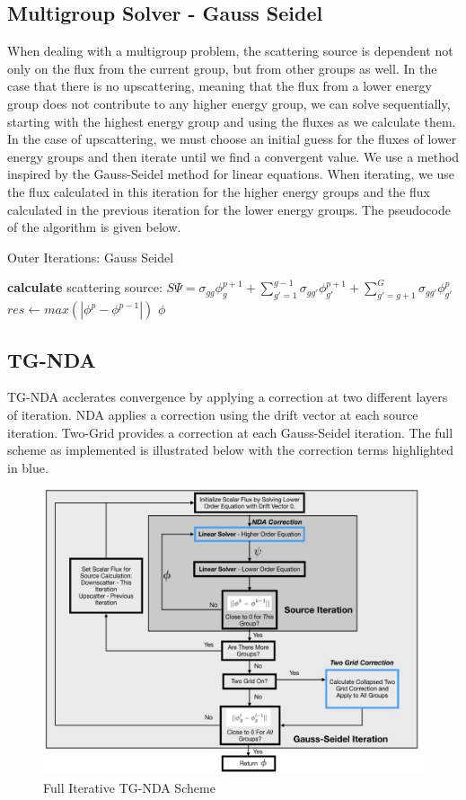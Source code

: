 \subsection{Multigroup Solver - Gauss Seidel}
When dealing with a multigroup problem, the scattering source is dependent not only on the flux from the current group, but from other groups as well. In the case that there is no upscattering, meaning that the flux from a lower energy group does not contribute to any higher energy group, we can solve sequentially, starting with the highest energy group and using the fluxes as we calculate them. In the case of upscattering, we must choose an initial guess for the fluxes of lower energy groups and then iterate until we find a convergent value. We use a method inspired by the Gauss-Seidel method for linear equations. When iterating, we use the flux calculated in this iteration for the higher energy groups and the flux calculated in the previous iteration for the lower energy groups. The pseudocode of the algorithm is given below. 
\begin{algorithm}
\caption{Outer Iterations: Gauss Seidel}
\begin{algorithmic}
     
            \State \textbf{calculate} scattering source: \State $S\Psi = \sigma_{gg}\phi_g^{p+1} + \sum\limits_{g'=1}^{g-1} \sigma_{gg'} \phi_{g'}^{p+1} + \sum\limits_{g'=g+1}^G \sigma_{gg'}\phi_{g'}^p$
        \EndProcedure
        \EndFor
        \State $res \gets max(|\phi^{p} - \phi^{p-1}|)$  
        \EndWhile
    \Return $\phi$
\end{algorithmic}
\end{algorithm}

\subsection{TG-NDA}
TG-NDA acclerates convergence by applying a correction at two different layers of iteration. NDA applies a correction using the drift vector at each source iteration. Two-Grid provides a correction at each Gauss-Seidel iteration. The full scheme as implemented is illustrated below with the correction terms highlighted in blue. 


\begin{figure}[H]
    \centering
    \includegraphics[width=\textwidth]{fig/TGNDAchart.png}
    \caption{Full Iterative TG-NDA Scheme}
    \label{fig:tgnda-graph}
\end{figure}